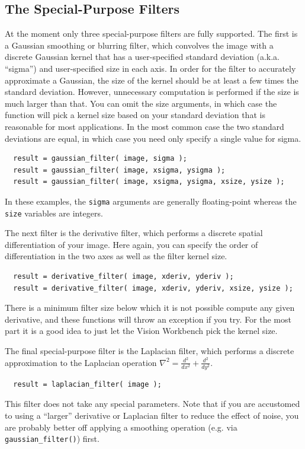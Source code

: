 \subsection{The Special-Purpose Filters}

At the moment only three special-purpose filters are fully supported.
The first is a Gaussian smoothing or blurring filter, which convolves
the image with a discrete Gaussian kernel that has a user-specified
standard deviation (a.k.a. ``sigma'') and user-specified size in each
axis. In order for the filter to accurately approximate a Gaussian,
the size of the kernel should be at least a few times the standard
deviation.  However, unnecessary computation is performed if the size
is much larger than that.  You can omit the size arguments, in which
case the function will pick a kernel size based on your standard
deviation that is reasonable for most applications.  In the most
common case the two standard deviations are equal, in which case you
need only specify a single value for sigma.
\begin{verbatim}
  result = gaussian_filter( image, sigma );
  result = gaussian_filter( image, xsigma, ysigma );
  result = gaussian_filter( image, xsigma, ysigma, xsize, ysize );
\end{verbatim}
In these examples, the \verb#sigma# arguments are generally
floating-point whereas the \verb#size# variables are integers.

The next filter is the derivative filter, which performs a 
discrete spatial differentiation of your image.  Here again, you 
can specify the order of differentiation in the two axes as well 
as the filter kernel size.
\begin{verbatim}
  result = derivative_filter( image, xderiv, yderiv );
  result = derivative_filter( image, xderiv, yderiv, xsize, ysize );
\end{verbatim}
There is a minimum filter size below which it is not possible compute
any given derivative, and these functions will throw an exception if
you try.  For the most part it is a good idea to just let the Vision
Workbench pick the kernel size.

The final special-purpose filter is the Laplacian filter, which 
performs a discrete approximation to the Laplacian operation
$\nabla^2=\frac{d^2}{dx^2}+\frac{d^2}{dy^2}$.
\begin{verbatim}
  result = laplacian_filter( image );
\end{verbatim}
This filter does not take any special parameters.  Note that if you 
are accustomed to using a ``larger'' derivative or Laplacian filter 
to reduce the effect of noise, you are probably better off applying 
a smoothing operation (e.g. via \verb#gaussian_filter()#) first.

